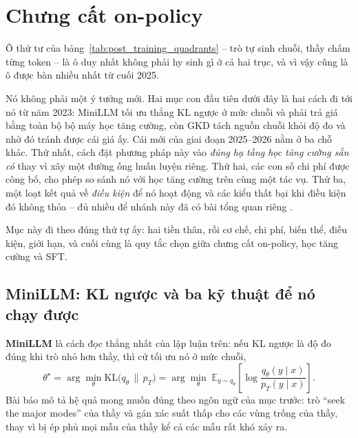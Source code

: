 
\section{Chưng cất on-policy}
\label{sec:on_policy_distillation}

Ô thứ tư của bảng~\ref{tab:post_training_quadrants} -- trò tự sinh chuỗi, thầy chấm từng token -- là ô duy nhất không phải hy sinh gì ở cả hai trục, và vì vậy cũng là ô được bàn nhiều nhất từ cuối 2025.

Nó không phải một ý tưởng mới. Hai mục con đầu tiên dưới đây là hai cách đi tới nó từ năm 2023: MiniLLM tối ưu thẳng KL ngược ở mức chuỗi và phải trả giá bằng toàn bộ bộ máy học tăng cường, còn GKD tách nguồn chuỗi khỏi độ đo và nhờ đó tránh được cái giá ấy. Cái mới của giai đoạn 2025--2026 nằm ở ba chỗ khác. Thứ nhất, cách đặt phương pháp này vào \emph{đúng hạ tầng học tăng cường sẵn có} thay vì xây một đường ống huấn luyện riêng. Thứ hai, các con số chi phí được công bố, cho phép so sánh nó với học tăng cường trên cùng một tác vụ. Thứ ba, một loạt kết quả về \emph{điều kiện} để nó hoạt động và các kiểu thất bại khi điều kiện đó không thỏa -- đủ nhiều để nhánh này đã có bài tổng quan riêng \cite{song2026opdsurvey}.

Mục này đi theo đúng thứ tự ấy: hai tiền thân, rồi cơ chế, chi phí, biến thể, điều kiện, giới hạn, và cuối cùng là quy tắc chọn giữa chưng cất on-policy, học tăng cường và SFT.

\subsection{MiniLLM: KL ngược và ba kỹ thuật để nó chạy được}
\label{ssec:minillm}

\textbf{MiniLLM} \cite{gu2024minillm} là cách đọc thẳng nhất của lập luận trên: nếu KL ngược là độ đo đúng khi trò nhỏ hơn thầy, thì cứ tối ưu nó ở mức chuỗi,
\[
\theta^\star = \arg\min_\theta \mathrm{KL}\big(q_\theta \,\|\, p_T\big)
= \arg\min_\theta \; \mathbb{E}_{y\sim q_\theta}\left[\log\frac{q_\theta(y\mid x)}{p_T(y\mid x)}\right].
\]
Bài báo mô tả hệ quả mong muốn đúng theo ngôn ngữ của mục trước: trò ``seek the major modes'' của thầy và gán xác suất thấp cho các vùng trống của thầy, thay vì bị ép phủ mọi mẫu của thầy kể cả các mẫu rất khó xảy ra.

